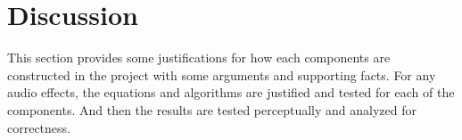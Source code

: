 \documentclass[12pt,letterpaper]{article}
\numberwithin{equation}{section}
\begin{document}






\clearpage
{}
\setcounter{page}{1}

\tableofcontents
\listoffigures
\listoftables



\clearpage
\setcounter{page}{1}


% 

\section{Discussion}

This section provides some justifications for how each components are constructed
in the project with some arguments and supporting facts. For any audio effects, the equations 
and algorithms are justified and tested for each of the components. And then the results are tested 
perceptually and analyzed for correctness.






\pagebreak





\pagebreak






\pagebreak

\glsaddall
\printglossary
\end{document}
